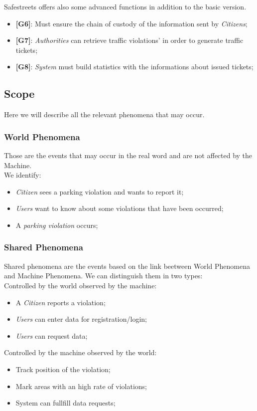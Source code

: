 \documentclass{article}
\begin{document}
Safestreets offers also some advanced functions in addition to the basic version.
\begin{itemize}
    \item \textbf{[G6]}: Must ensure the chain of custody of the information sent by \textit{Citizens};
    \item \textbf{[G7]}: \textit{Authorities} can retrieve traffic violations' in order to generate traffic tickets;
    \item \textbf{[G8]}: \textit{System} must build statistics with the informations about issued tickets;
\end{itemize}

\subsection{Scope}
Here we will describe all the relevant phenomena that may occur. 

\subsubsection{World Phenomena}
Those are the events that may occur in the real word and are not affected by the Machine.
\\We identify:
\begin{itemize}
    \item \textit{Citizen} sees a parking violation and wants to report it;
    \item \textit{Users} want to know about some violations that have been occurred;
    \item A \textit{parking violation} occurs; 
\end{itemize} 

\subsubsection{Shared Phenomena}
Shared phenomena are the events based on the link beetween World Phenomena and Machine Phenomena.
We can distinguish them in two types:
\\
Controlled by the world observed by the machine:
\begin{itemize}
    \item A \textit{Citizen} reports a violation;
    \item \textit{Users} can enter data for registration/login;
    \item \textit{Users} can request data;
\end{itemize}
Controlled by the machine observed by the world:
\begin{itemize}
    \item Track position of the violation;
    \item Mark areas with an high rate of violations;
    \item System can fullfill data requests;
\end{itemize}
\end{document}
